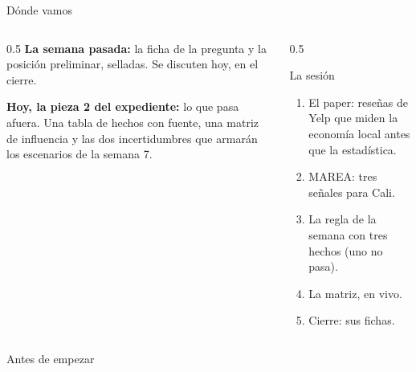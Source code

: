 \documentclass{beamer}
\begin{document}
\begin{frame}
\titlepage
\end{frame}

\begin{frame}{Dónde vamos}
\begin{columns}[T]
\begin{column}{0.5\textwidth}
\textbf{La semana pasada:} la ficha de la pregunta y la posición preliminar, selladas. Se discuten hoy, en el cierre.

\medskip
\textbf{Hoy, la pieza 2 del expediente:} lo que pasa afuera. Una tabla de hechos con fuente, una matriz de influencia y las dos incertidumbres que armarán los escenarios de la semana 7.
\end{column}
\begin{column}{0.5\textwidth}
\begin{block}{La sesión}
\begin{enumerate}
  \item El paper: reseñas de Yelp que miden la economía local antes que la estadística.
  \item MAREA: tres señales para Cali.
  \item La regla de la semana con tres hechos (uno no pasa).
  \item La matriz, en vivo.
  \item Cierre: sus fichas.
\end{enumerate}
\end{block}
\end{column}
\end{columns}
\end{frame}

\begin{frame}{Antes de empezar}
\end{frame}
\end{document}

